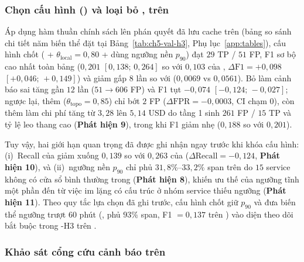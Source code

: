 \subsubsection{Chọn cấu hình \CTAV{} () và loại bỏ ,  trên }
\label{sec:ch5-val-ctav}

Áp dụng hàm thuần chính sách lên phán quyết đã lưu cache trên  (bảng so sánh chi tiết năm biến thể đặt tại Bảng~\ref{tab:ch5-val-h3}, Phụ lục~\ref{app:tables}), cấu hình \CTAV{} chốt ( + $\theta_{\text{local}} = 0{,}80$ +  dùng ngưỡng nền  $p_{90}$) đạt $29$ TP / $51$ FP, F1 sơ bộ cao nhất toàn bảng ($0{,}201$ $[0{,}138;\, 0{,}264]$ so với $0{,}103$ của , $\Delta\text{F1} = +0{,}098$ $[+0{,}046;\, +0{,}149]$) và giảm  gấp $8$ lần so với  ($0{,}0069$ vs $0{,}0561$). Bỏ  làm cảnh báo sai tăng gần $12$ lần ($51 \to 606$ FP) và F1 tụt $-0{,}074$ $[-0{,}124;\, -0{,}027]$; ngược lại, thêm  ($\theta_{\text{topo}} = 0{,}85$) chỉ bớt $2$ FP ($\Delta\text{FPR} = -0{,}0003$, CI chạm $0$), còn thêm  làm chi phí tăng từ $3{,}28$ lên $5{,}14$ USD do tầng 1  sinh $261$ FP / $15$ TP và tỷ lệ leo thang cao (\textbf{Phát hiện 9}), trong khi F1 giảm nhẹ ($0{,}188$ so với $0{,}201$).

Tuy vậy, hai giới hạn quan trọng đã được ghi nhận ngay trước khi khóa cấu hình: (i)~Recall của \CTAV{} giảm xuống $0{,}139$ so với $0{,}263$ của  ($\Delta\text{Recall} = -0{,}124$, \textbf{Phát hiện 10}), và (ii)~ngưỡng nền  $p_{90}$ chỉ phủ $31{,}8\%$--$33{,}2\%$ span trên  do $15$ service không có cửa sổ bình thường trong  (\textbf{Phát hiện 8}), khiến ưu thế của ngưỡng tĩnh  một phần đến từ việc im lặng có cấu trúc ở nhóm service thiếu ngưỡng (\textbf{Phát hiện 11}). Theo quy tắc lựa chọn đã ghi trước, cấu hình chốt giữ  $p_{90}$ và đưa biến thể ngưỡng trượt 60 phút (, phủ $93\%$ span, F1 $= 0{,}137$ trên ) vào diện theo dõi bắt buộc trong \hyp{H3} trên .

\subsubsection{Khảo sát cổng cứu cảnh báo  trên }
\label{sec:ch5-c5}


